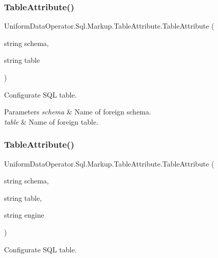 \subsubsection{\texorpdfstring{Table\+Attribute()}{TableAttribute()}\hspace{0.1cm}{\footnotesize\ttfamily [1/2]}}
{\footnotesize\ttfamily Uniform\+Data\+Operator.\+Sql.\+Markup.\+Table\+Attribute.\+Table\+Attribute (\begin{DoxyParamCaption}\item[{string}]{schema,  }\item[{string}]{table }\end{DoxyParamCaption})}



Configurate S\+QL table. 


\begin{DoxyParams}{Parameters}
{\em schema} & Name of foreign schema.\\
\hline
{\em table} & Name of foreign table.\\
\hline
\end{DoxyParams}
\mbox{\label{class_uniform_data_operator_1_1_sql_1_1_markup_1_1_table_attribute_a085ad4c643842f099ce19c6113e2475f}} 
\subsubsection{\texorpdfstring{Table\+Attribute()}{TableAttribute()}\hspace{0.1cm}{\footnotesize\ttfamily [2/2]}}
{\footnotesize\ttfamily Uniform\+Data\+Operator.\+Sql.\+Markup.\+Table\+Attribute.\+Table\+Attribute (\begin{DoxyParamCaption}\item[{string}]{schema,  }\item[{string}]{table,  }\item[{string}]{engine }\end{DoxyParamCaption})}



Configurate S\+QL table. 


